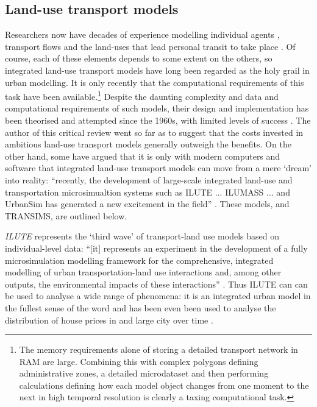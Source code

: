 \subsection{Land-use transport models}
Researchers now have decades of experience modelling individual agents
\citep{Ortuzar1982},
transport flows \citep{Wilson1970} and the land-uses that lead personal
transit to take place \citep{batty1976urban}.
Of course, each of these elements depends to some extent on the others, so
integrated land-use transport models have long been regarded as the holy grail
in urban modelling. It is only recently that the computational
requirements of this task have been
available.\footnote{The memory requirements alone of storing a detailed
transport network in RAM are large. Combining this with complex polygons
defining administrative zones, a detailed microdataset and then performing
calculations defining how each model object changes from one moment to the next
in high temporal resolution is clearly a taxing computational task.
}
Despite the daunting complexity and data and computational requirements of such
models, their design and implementation has been theorised and attempted
since the 1960s, with limited levels of success
\citep{timmermans2003saga}. The author of this critical review went so far as
to suggest that the costs invested in ambitious land-use transport models
generally outweigh the benefits.
On the other hand, some have argued that it is only with modern computers and software
that integrated land-use transport models can move from a mere
`dream' \citep{timmermans2003saga}  into reality: ``recently,
the development of large-scale integrated land-use and
transportation microsimualtion systems such as ILUTE ... ILUMASS
... and UrbanSim has generated a new excitement in the field'' \citep[p.~935]{Pinjari2011}.
These models, and TRANSIMS, are outlined below.


\emph{ILUTE}  represents the `third wave' of transport-land use
models based on individual-level data:
``[it] represents an experiment in the development of a
fully microsimulation modelling
framework for the comprehensive, integrated modelling of urban transportation-land use
interactions and, among other outputs, the environmental impacts of these interactions''
\citep[p.~15]{timmermans2003saga}. Thus ILUTE can can be used to analyse a wide range
of phenomena: it is an integrated urban model in the fullest sense of the word
and has been even been used to analyse the distribution of house prices
in and large city over time \citep{Farooq2012-integreted}.

